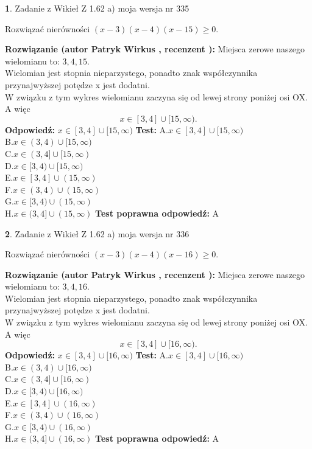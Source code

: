 \documentclass[12pt, a4paper]{article}
\theoremstyle{definition} %
\newtheorem{zad}{}
\newcommand{\zadStart}[1]{\begin{zad}#1\newline}
\newcommand{\zadStop}{\end{zad}}
\newcommand{\rozwStart}[2]{\noindent \textbf{Rozwiązanie (autor #1 , recenzent #2): }\newline}
\newcommand{\rozwStop}{\newline}
\newcommand{\odpStart}{\noindent \textbf{Odpowiedź:}\newline}
\newcommand{\odpStop}{\newline}
\newcommand{\testStart}{\noindent \textbf{Test:}\newline}
\newcommand{\testStop}{\newline}
\newcommand{\kluczStart}{\noindent \textbf{Test poprawna odpowiedź:}\newline}
\newcommand{\kluczStop}{\newline}
\begin{document}
\zadStart{Zadanie z Wikieł Z 1.62 a) moja wersja nr 335}

Rozwiązać nierówności $(x-3)(x-4)(x-15)\ge0$.
\zadStop
\rozwStart{Patryk Wirkus}{}
Miejsca zerowe naszego wielomianu to: $3, 4, 15$.\\
Wielomian jest stopnia nieparzystego, ponadto znak współczynnika przy\linebreak najwyższej potędze x jest dodatni.\\ W związku z tym wykres wielomianu zaczyna się od lewej strony poniżej osi OX. A więc $$x \in [3,4] \cup [15,\infty).$$
\rozwStop
\odpStart
$x \in [3,4] \cup [15,\infty)$
\odpStop
\testStart
A.$x \in [3,4] \cup [15,\infty)$\\
B.$x \in (3,4) \cup [15,\infty)$\\
C.$x \in (3,4] \cup [15,\infty)$\\
D.$x \in [3,4) \cup [15,\infty)$\\
E.$x \in [3,4] \cup (15,\infty)$\\
F.$x \in (3,4) \cup (15,\infty)$\\
G.$x \in [3,4) \cup (15,\infty)$\\
H.$x \in (3,4] \cup (15,\infty)$
\testStop
\kluczStart
A
\kluczStop



\zadStart{Zadanie z Wikieł Z 1.62 a) moja wersja nr 336}

Rozwiązać nierówności $(x-3)(x-4)(x-16)\ge0$.
\zadStop
\rozwStart{Patryk Wirkus}{}
Miejsca zerowe naszego wielomianu to: $3, 4, 16$.\\
Wielomian jest stopnia nieparzystego, ponadto znak współczynnika przy\linebreak najwyższej potędze x jest dodatni.\\ W związku z tym wykres wielomianu zaczyna się od lewej strony poniżej osi OX. A więc $$x \in [3,4] \cup [16,\infty).$$
\rozwStop
\odpStart
$x \in [3,4] \cup [16,\infty)$
\odpStop
\testStart
A.$x \in [3,4] \cup [16,\infty)$\\
B.$x \in (3,4) \cup [16,\infty)$\\
C.$x \in (3,4] \cup [16,\infty)$\\
D.$x \in [3,4) \cup [16,\infty)$\\
E.$x \in [3,4] \cup (16,\infty)$\\
F.$x \in (3,4) \cup (16,\infty)$\\
G.$x \in [3,4) \cup (16,\infty)$\\
H.$x \in (3,4] \cup (16,\infty)$
\testStop
\kluczStart
A
\kluczStop
\end{document}
